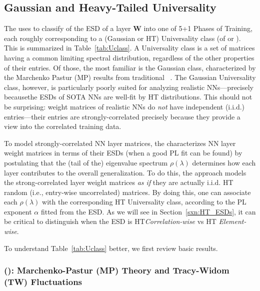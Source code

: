 
\subsection{Gaussian and Heavy-Tailed Universality}
\label{sxn:guass_ht_univ}

The \HTSR \Phenomenology uses \RMT to classify of the ESD of a layer $\mathbf{W}$ into one of 5+1 Phases of Training, 
each roughly corresponding to a (Gaussian or HT) Universality class (of \RMT or \HTRMT).
This is summarized in Table~\ref{tab:Uclass}. 
A Universality class is a set of matrices having a common limiting spectral distribution, regardless of the other properties of their entries. 
Of those, the most familiar is the Gaussian class, characterized by the Marchenko Pastur (MP) results from traditional \RMT~\cite{EW13,potters_bouchaud_2020}. 
The Gaussian Universality class, however, is particularly poorly suited for analyzing realistic NNs---precisely
becausethe ESDs of SOTA NNs are well-fit by HT distributions.
This should not be surprising: weight matrices of realistic NNs do \emph{not} have independent (i.i.d.)
entries---their entries are strongly-correlated precisely because they provide a view into the correlated training data.

To model strongly-correlated NN layer matrices, the \HTSR \Phenomenology characterizes NN layer weight matrices
in terms of their ESDs (when a good PL fit can be found) by postulating that the (tail of the) eigenvalue spectrum $\rho(\lambda)$ 
determines how each layer contributes to the overall generalization.  
To do this, the \HTSR approach models the strong-correlated layer weight matrices \emph{as if} they are actually i.i.d. HT random
(i.e., entry-wise uncorrelated) matrices. 
By doing this, one can  associate each $\rho(\lambda)$ with 
the corresponding HT Universality class, according to the PL exponent $\alpha$ fitted from the ESD. 
As we will see in 
Section~\ref{sxn:HT_ESDs}, it can be critical to distinguish  when the ESD is HT\emph{Correlation-wise} vs HT \emph{Element-wise}.

To understand Table~\ref{tab:Uclass} better, we first review basic results.  %


\subsubsection{\RandomMatrixTheory (\RMT):  Marchenko-Pastur (MP) Theory and Tracy-Widom (TW) Fluctuations}

